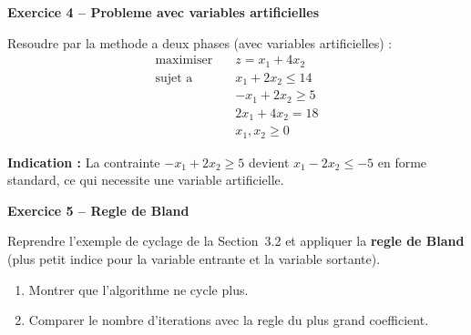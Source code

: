 \documentclass[12pt,a4paper]{article}
\begin{document}
\begin{exemple}
\textbf{Exercice 4 -- Probleme avec variables artificielles}

Resoudre par la methode a deux phases (avec variables artificielles) :
\begin{align*}
\text{maximiser} \quad & z = x_1 + 4x_2\\
\text{sujet a} \quad & x_1 + 2x_2 \leq 14\\
& -x_1 + 2x_2 \geq 5\\
& 2x_1 + 4x_2 = 18\\
& x_1, x_2 \geq 0
\end{align*}

\textbf{Indication :} La contrainte $-x_1 + 2x_2 \geq 5$ devient $x_1 - 2x_2 \leq -5$ en forme standard, ce qui necessite une variable artificielle.
\end{exemple}

\begin{exemple}
\textbf{Exercice 5 -- Regle de Bland}

Reprendre l'exemple de cyclage de la Section~3.2 et appliquer la \textbf{regle de Bland} (plus petit indice pour la variable entrante et la variable sortante).

\begin{enumerate}
    \item Montrer que l'algorithme ne cycle plus.
    \item Comparer le nombre d'iterations avec la regle du plus grand coefficient.
\end{enumerate}
\end{exemple}
\end{document}
